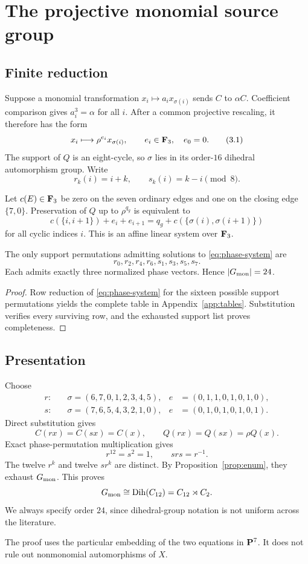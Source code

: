 \section{The projective monomial source group}

\subsection{Finite reduction}

Suppose a monomial transformation
\(x_i\mapsto a_ix_{\sigma(i)}\) sends \(C\) to \(\alpha C\).
Coefficient comparison gives \(a_i^3=\alpha\) for all \(i\).  After a
common projective rescaling, it therefore has the form
\[
 x_i\longmapsto \rho^{e_i}x_{\sigma(i)},\qquad
 e_i\in\mathbf F_3,\quad e_0=0.                            \tag{3.1}
\]
The support of \(Q\) is an eight-cycle, so \(\sigma\) lies in its
order-\(16\) dihedral automorphism group.  Write
\[
 r_k(i)=i+k,\qquad s_k(i)=k-i\pmod8.
\]

Let \(c(E)\in\mathbf F_3\) be zero on the seven ordinary edges and one on the
closing edge \(\{7,0\}\).  Preservation of \(Q\) up to
\(\rho^{q_g}\) is equivalent to
\begin{equation}
\label{eq:phase-system}
 c(\{i,i+1\})+e_i+e_{i+1}
 =q_g+c(\{\sigma(i),\sigma(i+1)\})
\end{equation}
for all cyclic indices \(i\).  This is an affine linear system over
\(\mathbf F_3\).

\begin{proposition}
\label{prop:enum}
The only support permutations admitting solutions to
\eqref{eq:phase-system} are
\[
 r_0,r_2,r_4,r_6,s_1,s_3,s_5,s_7.
\]
Each admits exactly three normalized phase vectors.  Hence
\(|G_{\mathrm{mon}}|=24\).
\end{proposition}

\begin{proof}
Row reduction of \eqref{eq:phase-system} for the sixteen possible
support permutations yields the complete table in
Appendix~\ref{app:tables}.  Substitution verifies every surviving row,
and the exhausted support list proves completeness.
\end{proof}

\subsection{Presentation}

Choose
\[
\begin{aligned}
r:&\quad \sigma=(6,7,0,1,2,3,4,5),&
e&=(0,1,1,0,1,0,1,0),\\
s:&\quad \sigma=(7,6,5,4,3,2,1,0),&
e&=(0,1,0,1,0,1,0,1).
\end{aligned}                                      \tag{3.2}
\]
Direct substitution gives
\[
 C(rx)=C(sx)=C(x),\qquad Q(rx)=Q(sx)=\rho Q(x).
\]
Exact phase-permutation multiplication gives
\[
 r^{12}=s^2=1,\qquad srs=r^{-1}.                   \tag{3.3}
\]
The twelve \(r^k\) and twelve \(sr^k\) are distinct.  By
Proposition~\ref{prop:enum}, they exhaust \(G_{\mathrm{mon}}\).  This proves
\[
 G_{\mathrm{mon}}\cong\operatorname{Dih}(C_{12})=C_{12}\rtimes C_2.
\]
We always specify order \(24\), since dihedral-group notation is not
uniform across the literature.

\begin{remark}
The proof uses the particular embedding of the two equations in
\(\mathbf P^7\).  It does not rule out nonmonomial automorphisms of \(X\).
\end{remark}
